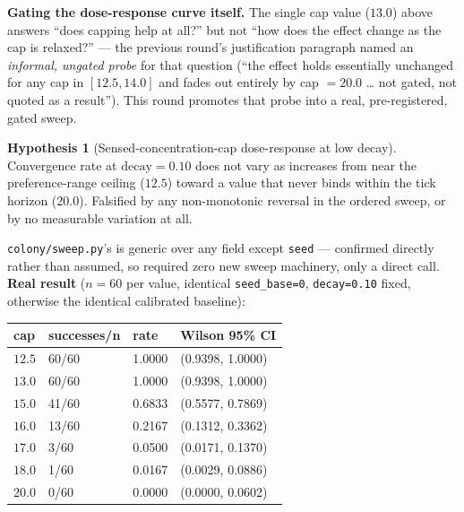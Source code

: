 \documentclass[
  english,
]{article}
\newcounter{none} %
\theoremstyle{definition}
\newtheorem{hypothesis}[theorem]{Hypothesis}
\begin{document}
\textbf{Gating the dose-response curve itself.} The single cap value
(\(13.0\)) above answers ``does capping help at all?'' but not ``how
does the effect change as the cap is relaxed?'' --- the previous round's
justification paragraph named an \emph{informal, ungated probe} for that
question (``the effect holds essentially unchanged for any cap in
\([12.5, 14.0]\) and fades out entirely by cap \(=20.0\) \ldots{} not
gated, not quoted as a result''). This round promotes that probe into a
real, pre-registered, gated sweep.

\begin{hypothesis}[Sensed-concentration-cap dose-response at low decay]
Convergence rate at \(\text{decay}=0.10\) does not vary as 
increases from near the preference-range ceiling (\(12.5\)) toward a value that never binds within
the tick horizon (\(20.0\)). Falsified by any non-monotonic reversal in the ordered sweep, or by no
measurable variation at all.
\end{hypothesis}

\texttt{colony/sweep.py}'s  is generic
over any  field except \texttt{seed} ---
confirmed directly rather than assumed, so
 required zero new sweep machinery,
only a direct call. \textbf{Real result} (\(n=60\) per value, identical
\texttt{seed\_base=0}, \texttt{decay=0.10} fixed, otherwise the
identical calibrated baseline):

{\def\LTcaptype{none} %
\begin{longtable}[]{@{}llll@{}}
\toprule\noalign{}
cap & successes/n & rate & Wilson 95\% CI \\
\midrule\noalign{}
\endhead
\bottomrule\noalign{}
\endlastfoot
\(12.5\) & 60/60 & 1.0000 & (0.9398, 1.0000) \\
\(13.0\) & 60/60 & 1.0000 & (0.9398, 1.0000) \\
\(15.0\) & 41/60 & 0.6833 & (0.5577, 0.7869) \\
\(16.0\) & 13/60 & 0.2167 & (0.1312, 0.3362) \\
\(17.0\) & 3/60 & 0.0500 & (0.0171, 0.1370) \\
\(18.0\) & 1/60 & 0.0167 & (0.0029, 0.0886) \\
\(20.0\) & 0/60 & 0.0000 & (0.0000, 0.0602) \\
\end{longtable}
}
\end{document}
